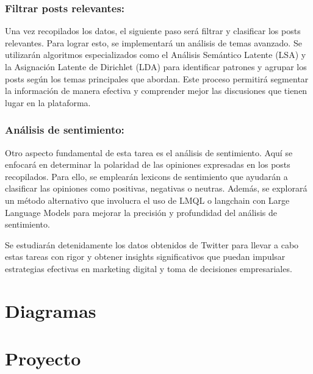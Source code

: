 \documentclass[
]{journal}
\begin{document}
\subsubsection{Filtrar posts
relevantes:}\label{filtrar-posts-relevantes}

Una vez recopilados los datos, el siguiente paso será filtrar y
clasificar los posts relevantes. Para lograr esto, se implementará un
análisis de temas avanzado. Se utilizarán algoritmos especializados como
el Análisis Semántico Latente (LSA) y la Asignación Latente de Dirichlet
(LDA) para identificar patrones y agrupar los posts según los temas
principales que abordan. Este proceso permitirá segmentar la información
de manera efectiva y comprender mejor las discusiones que tienen lugar
en la plataforma.

\subsubsection{Análisis de
sentimiento:}\label{anuxe1lisis-de-sentimiento}

Otro aspecto fundamental de esta tarea es el análisis de sentimiento.
Aquí se enfocará en determinar la polaridad de las opiniones expresadas
en los posts recopilados. Para ello, se emplearán lexicons de
sentimiento que ayudarán a clasificar las opiniones como positivas,
negativas o neutras. Además, se explorará un método alternativo que
involucra el uso de LMQL o langchain con Large Language Models para
mejorar la precisión y profundidad del análisis de sentimiento.

Se estudiarán detenidamente los datos obtenidos de Twitter para llevar a
cabo estas tareas con rigor y obtener insights significativos que puedan
impulsar estrategias efectivas en marketing digital y toma de decisiones
empresariales.

\section{Diagramas}\label{diagramas}

\section{Proyecto}\label{proyecto}
\end{document}
